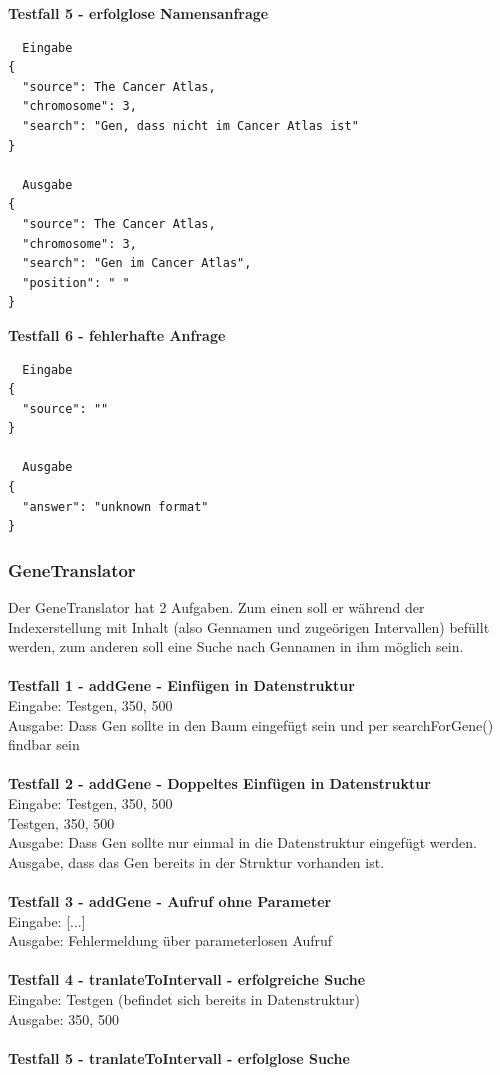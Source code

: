 \textbf{Testfall 5 - erfolglose Namensanfrage}
\begin{verbatim}
  Eingabe
{
  "source": The Cancer Atlas,
  "chromosome": 3,
  "search": "Gen, dass nicht im Cancer Atlas ist"
}

  Ausgabe
{
  "source": The Cancer Atlas,
  "chromosome": 3,
  "search": "Gen im Cancer Atlas",
  "position": " "
}
\end{verbatim}
\textbf{Testfall 6 - fehlerhafte Anfrage}
\begin{verbatim}
  Eingabe
{
  "source": ""
}

  Ausgabe
{
  "answer": "unknown format"
}
\end{verbatim}
\newpage
\subsubsection{GeneTranslator}
Der GeneTranslator hat 2 Aufgaben. Zum einen soll er während der Indexerstellung mit Inhalt (also Gennamen und zugeörigen Intervallen) befüllt werden, zum anderen soll eine Suche nach Gennamen in ihm möglich sein.\\
\\
\textbf{Testfall 1 - addGene - Einfügen in Datenstruktur}\\
Eingabe: Testgen, 350, 500\\
Ausgabe: Dass Gen sollte in den Baum eingefügt sein und per searchForGene() findbar sein\\
\\
\textbf{Testfall 2 - addGene - Doppeltes Einfügen in Datenstruktur}\\
Eingabe: Testgen, 350, 500\\
		 Testgen, 350, 500\\
Ausgabe: Dass Gen sollte nur einmal in die Datenstruktur eingefügt werden. Ausgabe, dass das Gen bereits in der Struktur vorhanden ist.\\
\\
\textbf{Testfall 3 - addGene - Aufruf ohne Parameter}\\
Eingabe: [...]\\
Ausgabe: Fehlermeldung über  parameterlosen Aufruf\\
\\
\textbf{Testfall 4 - tranlateToIntervall - erfolgreiche Suche}\\
Eingabe: Testgen (befindet sich bereits in Datenstruktur)\\
Ausgabe: 350, 500\\
\\
\textbf{Testfall 5 - tranlateToIntervall - erfolglose Suche}\\
